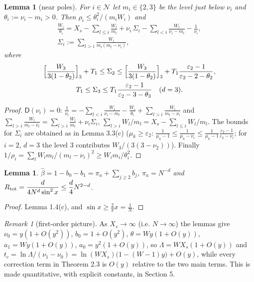 \documentclass[11pt,a4paper]{article}
\newtheorem{lemma}[theorem]{Lemma}
\theoremstyle{definition}
\theoremstyle{remark}
\newtheorem{remark}[theorem]{Remark}
\begin{document}
\begin{lemma}[{near poles}]
For $i\in\mathcal N$ let $m_i\in\{2,3\}$ be the level just below $\nu_i$ and $\theta_i:=\nu_i-m_i>0$. Then $\rho_i\le\theta_i^2/(m_iW_i)$ and
\begin{gather*}
\frac{W_i}{\theta_i}=X_s-\sum_{l\le i}\frac{W_l}{m_l}+\nu_i\,\Sigma_i-\sum_{l<i}\frac{W_l}{\nu_i-m_l}-\frac1{\nu_i}, \\
\Sigma_i:=\sum_{l>i}\frac{W_l}{m_l(m_l-\nu_i)},
\end{gather*}
where
\begin{gather*}
\Bigl[\frac{W_3}{3(1-\theta_2)}\Bigr]_3+T_1\le\Sigma_2\le\Bigl[\frac{W_3}{3(1-\theta_2)}\Bigr]_3+T_1\frac{\varepsilon_2-1}{\varepsilon_2-2-\theta_2}, \\
T_1\le\Sigma_3\le T_1\frac{\varepsilon_2-1}{\varepsilon_2-3-\theta_3}\quad(d=3).
\end{gather*}
\end{lemma}

\begin{proof}
$\mathsf D(\nu_i)=0$: $\frac1{\nu_i}=-\sum_{l<i}\frac{W_l}{\nu_i-m_l}-\frac{W_i}{\theta_i}+\sum_{l>i}\frac{W_l}{m_l-\nu_i}$ and $\sum_{l>i}\frac{W_l}{m_l-\nu_i}=\sum_{l>i}\frac{W_l}{m_l}+\nu_i\Sigma_i$, $\sum_{l>i}W_l/m_l=X_s-\sum_{l\le i}W_l/m_l$. The bounds for $\Sigma_i$ are obtained as in Lemma 3.3(c) ($\mu_k\ge\varepsilon_2$: $\frac1{\mu_k-1}\le\frac1{\mu_k-\nu_i}\le\frac1{\mu_k-1}\frac{\varepsilon_2-1}{\varepsilon_2-\nu_i}$; for $i=2$, $d=3$ the level $3$ contributes $W_3/(3(3-\nu_2))$). Finally $1/\rho_i=\sum_lW_lm_l/(m_l-\nu_i)^2\ge W_im_i/\theta_i^2$.
\end{proof}

\begin{lemma}
$\hat\beta=1-b_0-b_1=\pi_a+\sum_{j\ge2}b_j$, $\pi_a=N^{-d}$ and $R_{\rm tot}=\dfrac{d}{4N^d\sin^2x}\le\dfrac d4N^{2-d}$.
\end{lemma}

\begin{proof}
Lemma 1.4(c), and $\sin x\ge\frac2\pi x=\frac1N$.
\end{proof}

\begin{remark}[{first-order picture}]
As $X_s\to\infty$ (i.e. $N\to\infty$) the lemmas give $\nu_0=y(1+O(y^2))$, $b_0=1+O(y^2)$, $\theta=Wy(1+O(y))$, $a_1=Wy(1+O(y))$, $a_0=y^2(1+O(y))$, so $\Lambda=WX_s(1+O(y))$ and $t_c=\ln\Lambda/(\nu_1-\nu_0)=\ln(WX_s)\bigl(1-(W-1)y\bigr)+O(y)$, while every correction term in Theorem 2.3 is $O(y)$ relative to the two main terms. This is made quantitative, with explicit constants, in Section 5.
\end{remark}
\end{document}
